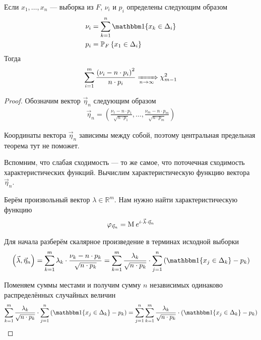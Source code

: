 \begin{theorem}
    Если $x_1, \dots, x_n$ --- выборка из $F$, $\nu_i$ и $p_i$ определены
    следующим образом
    \begin{align*}
        \nu_i &= \sum_{k=1}^{n}\Indicator{x_k \in \Delta_i} \\
        p_i &= \Probability[F]{x_1 \in \Delta_i}
    \end{align*}
    Тогда
    \begin{align*}
        \sum_{i=1}^{m}\frac{\left( \nu_i - n \cdot p_i \right)^2}{n \cdot p_i}
        \xRightarrow[n\to\infty]{} \chi_{m-1}^2
    \end{align*}
\end{theorem}
\begin{proof}
    Обозначим вектор $\vec{\eta}_n$ следующим образом
    \begin{align*}
        \vec{\eta}_n = \left( \frac{\nu_1 - n \cdot p_1}{\sqrt{n \cdot p_1}},
            \dots, \frac{\nu_m - n \cdot p_m}{\sqrt{n \cdot p_m}} \right)
    \end{align*}

    Координаты вектора $\vec{\eta}_n$ зависимы между собой, поэтому центральная
    предельная теорема тут не поможет.

    Вспомним, что слабая сходимость --- то же самое, что поточечная сходимость
    характеристических функций. Вычислим характеристическую функцию вектора
    $\vec{\eta}_n$.

    Берём произвольный вектор $\lambda \in \mathbb{R}^m$. Нам нужно найти
    характеристическую функцию
    \begin{align*}
        \varphi_{\vec{\eta}_n}
        = \operatorname{M}_{} e^{i \cdot \vec{\lambda} \cdot \vec{\eta}_n}
    \end{align*}

    Для начала разберём скалярное произведение в терминах исходной выборки
    \begin{align*}
        \left( \vec{\lambda}, \vec{\eta}_n \right)
        = \sum_{k=1}^{m} \lambda_k \cdot \frac{\nu_k - n \cdot p_k}{
                \sqrt{n \cdot p_k}}
        = \sum_{k=1}^{m}\frac{\lambda_k}{\sqrt{n \cdot p_k}}
            \cdot \sum_{j=1}^{n}\left(
                \Indicator{x_j \in \Delta_k} - p_k \right)
    \end{align*}

    Поменяем суммы местами и получим сумму $n$ независимых одинаково
    распределённых случайных величин
    \begin{align*}
        \sum_{k=1}^{m}\frac{\lambda_k}{\sqrt{n \cdot p_k}}
            \cdot \sum_{j=1}^{n}\left(
                \Indicator{x_j \in \Delta_k} - p_k \right)
        = \sum_{j=1}^{n}\sum_{k=1}^{m}\frac{\lambda_k}{\sqrt{n \cdot p_k}}
                \cdot \left( \Indicator{x_j \in \Delta_k} - p_k \right)
    \end{align*}


\end{proof}
